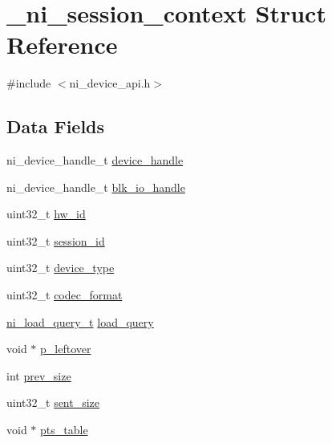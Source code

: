 \hypertarget{struct__ni__session__context}{}\section{\+\_\+ni\+\_\+session\+\_\+context Struct Reference}
\label{struct__ni__session__context}


{\ttfamily \#include $<$ni\+\_\+device\+\_\+api.\+h$>$}

\subsection*{Data Fields}
\begin{DoxyCompactItemize}
\item 
ni\+\_\+device\+\_\+handle\+\_\+t \mbox{\hyperlink{struct__ni__session__context_a4be6f6176ef1c1f36c9b873e0ac598ee}{device\+\_\+handle}}
\item 
ni\+\_\+device\+\_\+handle\+\_\+t \mbox{\hyperlink{struct__ni__session__context_aa375b9ac96074ffc858e6e9ecfb915bd}{blk\+\_\+io\+\_\+handle}}
\item 
uint32\+\_\+t \mbox{\hyperlink{struct__ni__session__context_a6118a901150ca3895d21bdad25430334}{hw\+\_\+id}}
\item 
uint32\+\_\+t \mbox{\hyperlink{struct__ni__session__context_a946f27f64a6c7500925f6d10c0b007aa}{session\+\_\+id}}
\item 
uint32\+\_\+t \mbox{\hyperlink{struct__ni__session__context_a11b71a6f868cf4482a6cfee4a08d13a0}{device\+\_\+type}}
\item 
uint32\+\_\+t \mbox{\hyperlink{struct__ni__session__context_a6972a0220282afb0857578bfe45fc53a}{codec\+\_\+format}}
\item 
\mbox{\hyperlink{ni__device__api_8h_a1338909d39289df25dc6df89904f5829}{ni\+\_\+load\+\_\+query\+\_\+t}} \mbox{\hyperlink{struct__ni__session__context_a54d72487a13f40c8d30ecdb2967fb7e0}{load\+\_\+query}}
\item 
void $\ast$ \mbox{\hyperlink{struct__ni__session__context_ac905a055d881964165495005536651de}{p\+\_\+leftover}}
\item 
int \mbox{\hyperlink{struct__ni__session__context_a16043d3d20e5bd0abbd2324e1c348066}{prev\+\_\+size}}
\item 
uint32\+\_\+t \mbox{\hyperlink{struct__ni__session__context_a85c1b2e9244d04321a8e54557704d7c6}{sent\+\_\+size}}
\item 
void $\ast$ \mbox{\hyperlink{struct__ni__session__context_a3fb8e824300426ee92c82f3ea744f6cf}{pts\+\_\+table}}

\end{DoxyCompactItemize}
